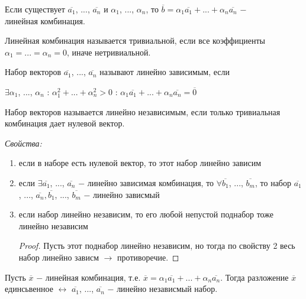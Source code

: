 \begin{definition}
	Если существует $\overline{a_1}$, ..., $\overline{a_n}$ и $\alpha_1$, ..., $\alpha_n$, то $\overline{b}=\alpha_1\overline{a_1}+...+\alpha_n\overline{a_n}$ $-$ $\textit{линейная комбинация}$. 
\end{definition}

Линейная комбинация называется $\textit{тривиальной}$, если все коэффициенты $\alpha_1=...=\alpha_n=0$, иначе $\textit{нетривиальной}$.

\begin{definition}
	Набор векторов $\overline{a_1}$, ..., $\overline{a_n}$ называют $\textit{линейно зависимым}$, если
	\begin{center}
		$\exists\alpha_1$, ..., $\alpha_n$ : $\alpha_1^2+...+\alpha_n^2 > 0$ : $\alpha_1\overline{a_1}+...+\alpha_n\overline{a_n} = \overline{0}$
	\end{center}
\end{definition}

\begin{definition}
	Набор векторов называется $\textit{линейно независимым}$, если только тривиальная комбинация дает нулевой вектор.
\end{definition}

\textit{Свойства:}

\begin{enumerate}
	\item если в наборе есть нулевой вектор, то этот набор линейно зависим
	\item если $\exists\overline{a_1}$, ..., $\overline{a_n}$ $-$ линейно зависимая комбинация, то $\forall\overline{b_1}$, ..., $\overline{b_m}$, то набор $\overline{a_1}$, ..., $\overline{a_n}, \overline{b_1}$, ..., $\overline{b_m}$ $-$ линейно зависмый
	\item если набор линейно независим, то его любой непустой поднабор тоже линейно независим
	\begin{proof}
		Пусть этот поднабор линейно независим, но тогда по свойству 2 весь набор линейно зависм $\longrightarrow$ противоречие.
	\end{proof}
\end{enumerate}

\begin{theorem}
	Пусть $\overline{x}$ $-$ линейная комбинация, т.е. $\overline{x}=\alpha_1\overline{a_1}+...+\alpha_n\overline{a_n}$. Тогда разложение $\overline{x}$ единсьвенное $\longleftrightarrow$ $\overline{a_1}$, ..., $\overline{a_n}$ $-$ линейно независмый набор.
\end{theorem}


